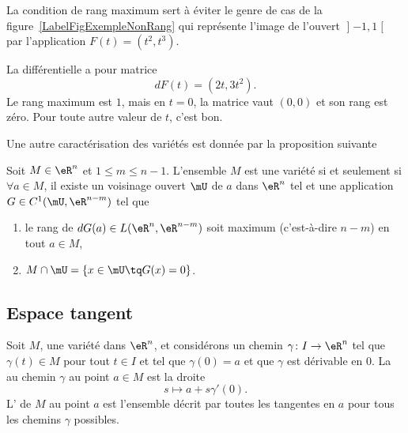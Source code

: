 La condition de rang maximum sert à éviter le genre de cas de la figure~\ref{LabelFigExempleNonRang} qui représente l'image de l'ouvert $\mathopen] -1 , 1 \mathclose[$ par l'application $F(t)=(t^2,t^3)$.
\newcommand{\CaptionFigExempleNonRang}{Quelque chose qui n'est pas de rang maximum et qui n'est pas une variété.}

%
La différentielle a pour matrice
\begin{equation}
    dF(t)=(2t,3t^2).
\end{equation}
Le rang maximum est $1$, mais en $t=0$, la matrice vaut $(0,0)$ et son rang est zéro. Pour toute autre valeur de $t$, c'est bon.

Une autre caractérisation des variétés est donnée par la proposition suivante %
\begin{proposition}     \label{PropCarVarZerFonc}
    Soit $M\in \eR^n$ et $1\leq m\leq n-1$. L'ensemble $M$ est une variété si et seulement si $\forall a\in M$, il existe un voisinage ouvert $\mU$ de $a$ dans $\eR^n$ tel et une application $G\in C^1(\mU,\eR^{n-m})$ tel que
    \begin{enumerate}

        \item
            le rang de $dG(a)\in L(\eR^n,\eR^{n-m})$ soit maximum (c'est-à-dire $n-m$) en tout $a\in M$,
        \item
            $M\cap\mU=\{ x\in\mU\tq G(x)=0 \}$.

    \end{enumerate}
\end{proposition}

\subsection{Espace tangent}

Soit $M$, une variété dans $\eR^n$, et considérons un chemin $\gamma\colon I\to \eR^n$ tel que $\gamma(t)\in M$ pour tout $t\in I$ et tel que $\gamma(0)=a$ et que $\gamma$ est dérivable en $0$. La  au chemin $\gamma$ au point $a\in M$ est la droite
\begin{equation}
    s\mapsto a+s\gamma'(0).
\end{equation}
L' de $M$ au point $a$ est l'ensemble décrit par toutes les tangentes en $a$ pour tous les chemins $\gamma$ possibles.

